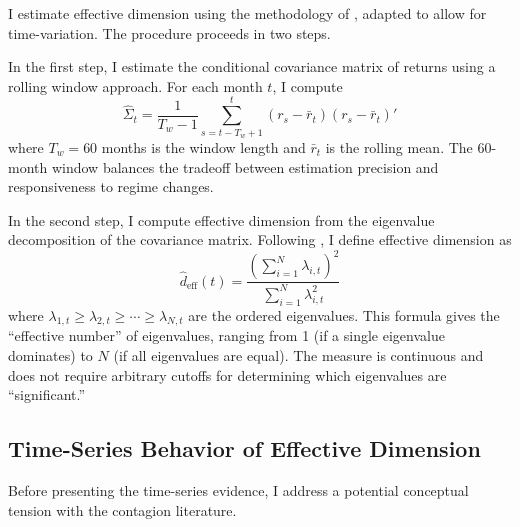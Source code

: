 \documentclass[12pt,letterpaper]{article}
\theoremstyle{plain}
\theoremstyle{definition}
\begin{document}
I estimate effective dimension using the methodology of \cite{kozak2018interpreting}, adapted to allow for time-variation. The procedure proceeds in two steps.

In the first step, I estimate the conditional covariance matrix of returns using a rolling window approach. For each month $t$, I compute
\begin{equation}\label{eq:rolling_cov}
\hat{\Sigma}_t = \frac{1}{T_w - 1} \sum_{s=t-T_w+1}^{t} (r_s - \bar{r}_t)(r_s - \bar{r}_t)'
\end{equation}
where $T_w = 60$ months is the window length and $\bar{r}_t$ is the rolling mean. The 60-month window balances the tradeoff between estimation precision and responsiveness to regime changes.

In the second step, I compute effective dimension from the eigenvalue decomposition of the covariance matrix. Following \cite{kozak2018interpreting}, I define effective dimension as
\begin{equation}\label{eq:effective_dim_formula}
\hat{d}_{\text{eff}}(t) = \frac{\left(\sum_{i=1}^{N} \lambda_{i,t}\right)^2}{\sum_{i=1}^{N} \lambda_{i,t}^2}
\end{equation}
where $\lambda_{1,t} \geq \lambda_{2,t} \geq \cdots \geq \lambda_{N,t}$ are the ordered eigenvalues. This formula gives the ``effective number'' of eigenvalues, ranging from 1 (if a single eigenvalue dominates) to $N$ (if all eigenvalues are equal). The measure is continuous and does not require arbitrary cutoffs for determining which eigenvalues are ``significant.''

\subsection{Time-Series Behavior of Effective Dimension}\label{subsec:dim_timeseries}

Before presenting the time-series evidence, I address a potential conceptual tension with the contagion literature.
\end{document}
